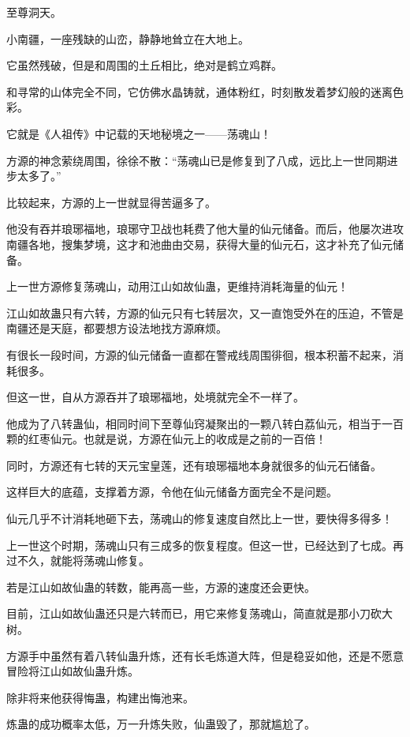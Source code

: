 
\begin{this_body}

至尊洞天。

小南疆，一座残缺的山峦，静静地耸立在大地上。

它虽然残破，但是和周围的土丘相比，绝对是鹤立鸡群。

和寻常的山体完全不同，它仿佛水晶铸就，通体粉红，时刻散发着梦幻般的迷离色彩。

它就是《人祖传》中记载的天地秘境之一——荡魂山！

方源的神念萦绕周围，徐徐不散：“荡魂山已是修复到了八成，远比上一世同期进步太多了。”

比较起来，方源的上一世就显得苦逼多了。

他没有吞并琅琊福地，琅琊守卫战也耗费了他大量的仙元储备。而后，他屡次进攻南疆各地，搜集梦境，这才和池曲由交易，获得大量的仙元石，这才补充了仙元储备。

上一世方源修复荡魂山，动用江山如故仙蛊，更维持消耗海量的仙元！

江山如故蛊只有六转，方源的仙元只有七转层次，又一直饱受外在的压迫，不管是南疆还是天庭，都要想方设法地找方源麻烦。

有很长一段时间，方源的仙元储备一直都在警戒线周围徘徊，根本积蓄不起来，消耗很多。

但这一世，自从方源吞并了琅琊福地，处境就完全不一样了。

他成为了八转蛊仙，相同时间下至尊仙窍凝聚出的一颗八转白荔仙元，相当于一百颗的红枣仙元。也就是说，方源在仙元上的收成是之前的一百倍！

同时，方源还有七转的天元宝皇莲，还有琅琊福地本身就很多的仙元石储备。

这样巨大的底蕴，支撑着方源，令他在仙元储备方面完全不是问题。

仙元几乎不计消耗地砸下去，荡魂山的修复速度自然比上一世，要快得多得多！

上一世这个时期，荡魂山只有三成多的恢复程度。但这一世，已经达到了七成。再过不久，就能将荡魂山修复。

若是江山如故仙蛊的转数，能再高一些，方源的速度还会更快。

目前，江山如故仙蛊还只是六转而已，用它来修复荡魂山，简直就是那小刀砍大树。

方源手中虽然有着八转仙蛊升炼，还有长毛炼道大阵，但是稳妥如他，还是不愿意冒险将江山如故仙蛊升炼。

除非将来他获得悔蛊，构建出悔池来。

炼蛊的成功概率太低，万一升炼失败，仙蛊毁了，那就尴尬了。


\end{this_body}
